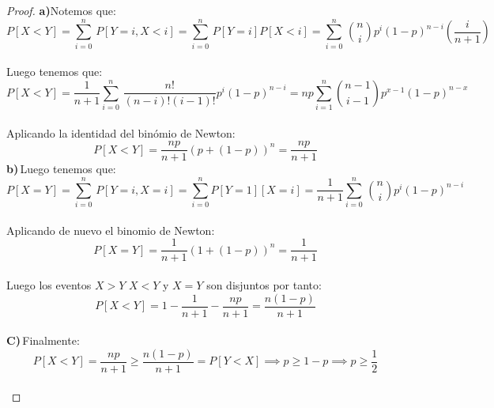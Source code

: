 \documentclass[11pt,letterpaper]{article}
\begin{document}
\begin{proof}
    \textbf{a)}Notemos que:\,\\
    \begin{equation*}
        P[X<Y]=\sum_{i=0}^{n}\,P[Y=i,X<i]=\sum_{i=0}^{n}\,P[Y=i]P[X<i]=\sum_{i=0}^n\,\binom{n}{i}p^i(1-p)^{n-i}\left(\frac{i}{n+1}\right)\,\,
    \end{equation*}\,\\
    Luego tenemos que:\,\\
    \begin{equation*}
        P[X<Y]=\frac{1}{n+1}\sum_{i=0}^{n}\,\frac{n!}{(n-i)!(i-1)!}p^{i}(1-p)^{n-i}=np\sum_{i=1}^n\binom{n-1}{i-1}p^{x-1}(1-p)^{n-x}
    \end{equation*}
    \,\\
    Aplicando la identidad del bin\'omio de Newton:\,\\
    \begin{equation*}
        P[X<Y]=\frac{np}{n+1}(p+(1-p))^n=\frac{np}{n+1}
    \end{equation*}
    \textbf{b)}\,Luego tenemos que:\,\\
      \begin{equation*}
        P[X=Y]=\sum_{i=0}^{n}\,P[Y=i,X=i]=\sum_{i=0}^{n}P[Y=1][X=i]=\frac{1}{n+1}\sum_{i=0}^n\,\binom{n}{i}p^i(1-p)^{n-i}
      \end{equation*}\,\\
      Aplicando de nuevo el binomio de Newton:\,\\
      \begin{equation*}
        P[X=Y]=\frac{1}{n+1}(1+(1-p))^n=\frac{1}{n+1}
      \end{equation*}\,\\
      Luego los eventos $X>Y$ $X<Y$ y $X=Y$ son disjuntos por tanto:\,\\
      \begin{equation*}
        P[X<Y]=1-\frac{1}{n+1}-\frac{np}{n+1}=\frac{n(1-p)}{n+1}
      \end{equation*}\,\\
      \textbf{C)}\,Finalmente:\,\\
      \begin{equation*}
        P[X<Y]=\frac{np}{n+1}\geq\frac{n(1-p)}{n+1}=P[Y<X]\implies p\geq1-p\implies p\geq \frac{1}{2}
      \end{equation*}\,\\


\end{proof}
\end{document}
